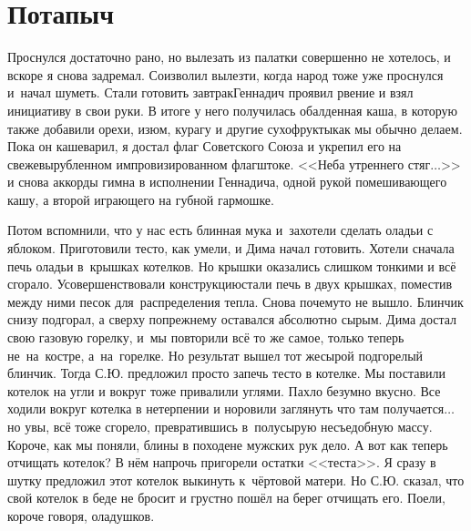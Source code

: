 \chapter{Потапыч} 
\vepsianrose

Проснулся достаточно рано, но вылезать из палатки совершенно не хотелось, и вскоре я снова задремал. Соизволил вылезти, когда народ тоже уже проснулся и~начал шуметь. Стали готовить завтрак\mdash Геннадич проявил рвение и взял инициативу в свои руки. В итоге у него получилась обалденная каша, в которую также добавили орехи, изюм, курагу и другие сухофрукты\mdash как мы обычно делаем. Пока он кашеварил, я достал флаг Советского Союза и укрепил его на свежевырубленном импровизированном флагштоке. <<Неба утреннего стяг$\ldots$>> и снова аккорды гимна в исполнении Геннадича, одной рукой помешивающего кашу, а второй играющего на губной гармошке.

Потом вспомнили, что у нас есть блинная мука и~захотели сделать оладьи с яблоком. Приготовили тесто, как умели, и Дима начал готовить. Хотели сначала печь оладьи в~крышках котелков. Но крышки оказались слишком тонкими и всё сгорало. Усовершенствовали конструкцию\mdash стали печь в двух крышках, поместив между ними песок для~распределения тепла. Снова почему\sdash то не вышло. Блинчик снизу подгорал, а сверху по\sdash прежнему оставался абсолютно сырым. Дима достал свою газовую горелку, и~мы повторили всё то же самое, только теперь не~на~костре, а~на~горелке. Но результат вышел тот же\mdash сырой подгорелый блинчик. Тогда С.Ю. предложил просто запечь тесто в котелке. Мы поставили котелок на угли и вокруг тоже привалили углями. Пахло безумно вкусно. Все ходили вокруг котелка в нетерпении и норовили заглянуть что там получается$\ldots$ но увы, всё тоже сгорело, превратившись в~полусырую несъедобную массу. Короче, как мы поняли, блины в походе\mdash не мужских рук дело. А вот как теперь отчищать котелок? В нём напрочь пригорели остатки <<теста>>. Я сразу в шутку предложил этот котелок выкинуть к~чёртовой матери. Но С.Ю. сказал, что свой котелок в беде не бросит и грустно пошёл на берег отчищать его. Поели, короче говоря, оладушков.

